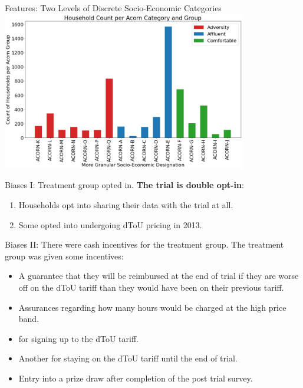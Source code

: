 \documentclass{beamer}
\begin{document}

\begin{frame}{Features: Two Levels of Discrete Socio-Economic Categories}
  \centering
  \includegraphics[width=0.8\textwidth]{images/acorn-group-category-house-count.png}
\end{frame}

\begin{frame}{Biases I: Treatment group opted in.}
  \textbf{The trial is double opt-in}:
  \begin{enumerate}
    \item<+-> Households opt into sharing their data with the trial at all.
    \item<+-> Some opted into undergoing dToU pricing in 2013.
  \end{enumerate}
\end{frame}

\begin{frame}{Biases II: There were cash incentives for the treatment group.}
  The treatment group was given some incentives: 
  \begin{itemize}
    \item A guarantee that they will be reimbursed at the end of trial if they are worse off on the dToU tariff than they would have been on their previous tariff.
    \item Assurances regarding how many hours would be charged at the high price band.
    \item {} for signing up to the dToU tariff.
    \item Another  for staying on the dToU tariff until the end of trial.
    \item Entry into a prize draw after completion of the post trial survey.
  \end{itemize}
\end{frame}
\end{document}
